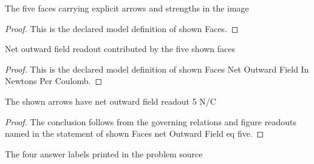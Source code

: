 \begin{definition}
  \label{def:physics:phyx-mini-0842:phyxminiproblems-problemphyxmini0842-shownfaces}
  The five faces carrying explicit arrows and strengths in the image
\end{definition}
\begin{proof}
  This is the declared model definition of shown Faces.
\end{proof}
\begin{definition}
  \label{def:physics:phyx-mini-0842:phyxminiproblems-problemphyxmini0842-shownfacesnetoutwardfieldinnewtonspercoulomb}
  Net outward field readout contributed by the five shown faces
\end{definition}
\begin{proof}
  This is the declared model definition of shown Faces Net Outward Field In Newtons Per Coulomb.
\end{proof}
\begin{lemma}
  \label{lem:physics:phyx-mini-0842:phyxminiproblems-problemphyxmini0842-shownfaces-netoutwardfield-eq-five}
  The shown arrows have net outward field readout 5 N/C
\end{lemma}
\begin{proof}
  The conclusion follows from the governing relations and figure readouts named in the statement of shown Faces net Outward Field eq five.
\end{proof}
\begin{definition}
  \label{def:physics:phyx-mini-0842:phyxminiproblems-problemphyxmini0842-answerchoice}
  The four answer labels printed in the problem source
\end{definition}
